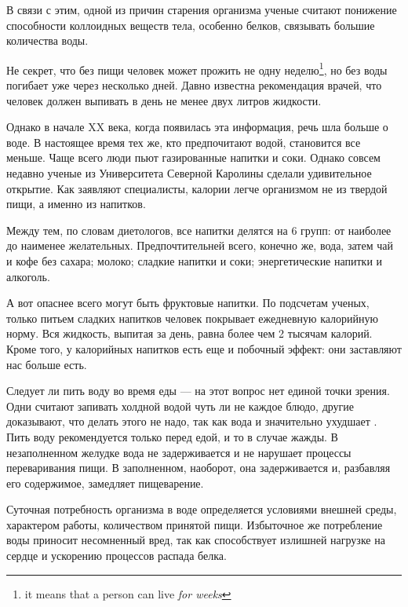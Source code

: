 В связи с этим, одной из причин старения организма ученые считают понижение способности коллоидных веществ тела, особенно белков, связывать большие количества воды.

Не секрет, что без пищи человек может прожить не одну неделю\footnote{it means that a person can live \textit{for weeks}}, но без воды погибает уже через несколько дней. Давно известна рекомендация врачей, что человек должен выпивать в день не менее двух литров жидкости.

Однако в начале XX века, когда появилась эта информация, речь шла больше о воде. В настоящее время тех же, кто предпочитают  водой, становится все меньше. Чаще всего люди пьют газированные напитки и соки. Однако совсем недавно ученые из Университета Северной Каролины сделали удивительное открытие. Как заявляют специалисты, калории легче  организмом не из твердой пищи, а именно из напитков.

Между тем, по словам диетологов, все напитки делятся на 6 групп: от наиболее до наименее желательных. Предпочтительней всего, конечно же, вода, затем чай и кофе без сахара; молоко; сладкие напитки и соки; энергетические напитки и алкоголь.

А вот опаснее всего могут быть фруктовые напитки. По подсчетам ученых, только питьем сладких напитков человек покрывает ежедневную калорийную норму. Вся жидкость, выпитая за день, равна более чем 2 тысячам калорий. Кроме того, у калорийных напитков есть еще и побочный эффект: они заставляют нас больше есть.

Следует ли пить воду во время еды --- на этот вопрос нет единой точки зрения. Одни считают  запивать холдной водой чуть ли не каждое блюдо, другие доказывают, что делать этого не надо, так как вода   и значительно ухудшает . Пить воду рекомендуется только перед едой, и то в случае жажды. В незаполненном желудке вода не задерживается и не нарушает процессы переваривания пищи. В заполненном, наоборот, она задерживается и, разбавляя его содержимое, замедляет пищеварение.

Суточная потребность организма в воде определяется условиями внешней среды, характером работы, количеством принятой пищи. Избыточное же потребление воды приносит несомненный вред, так как способствует излишней нагрузке на сердце и ускорению процессов распада белка.

